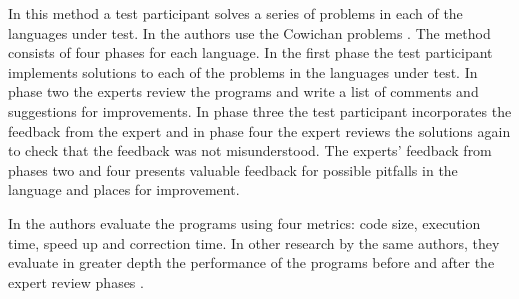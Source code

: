 In this method a test participant solves a series of problems in each of the languages under test. In \cite{nanz2013examining} the authors use the Cowichan problems \cite{wilson1995assessing}. The method consists of four phases for each language. In the first phase the test participant implements solutions to each of the problems in the languages under test. In phase two the experts review the programs and write a list of comments and suggestions for improvements. In phase three the test participant incorporates the feedback from the expert and in phase four the expert reviews the solutions again to check that the feedback was not misunderstood. The experts' feedback from phases two and four presents valuable feedback for possible pitfalls in the language and places for improvement.

In \cite{nanz2013examining} the authors evaluate the programs using four metrics: code size, execution time, speed up and correction time. In other research by the same authors, they evaluate in greater depth the performance of the programs before and after the expert review phases \cite{nanz2013benchmarking}.
